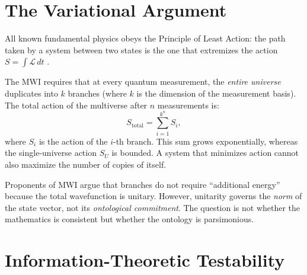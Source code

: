 \documentclass[12pt, a4paper]{article}
\theoremstyle{plain}
\theoremstyle{definition}
\begin{document}
\section{The Variational Argument}\label{sec:least_action}

\begin{axiom}\label{ax:least_action}
  All known fundamental physics obeys the Principle of Least Action: the
  path taken by a system between two states is the one that extremizes
  the action $S = \int \mathcal{L}\, dt$ \citep{Feynman1942, Landau1976}.
\end{axiom}

\begin{proposition}\label{prop:branching}
  The MWI requires that at every quantum measurement, the \emph{entire
  universe} duplicates into $k$ branches (where $k$ is the dimension of
  the measurement basis). The total action of the multiverse after $n$
  measurements is:
  \begin{equation}
    S_{\text{total}} = \sum_{i=1}^{k^n} S_i,
  \end{equation}
  where $S_i$ is the action of the $i$-th branch. This sum grows
  exponentially, whereas the single-universe action $S_U$ is bounded.
  A system that minimizes action cannot also maximize the number of
  copies of itself.
\end{proposition}

\begin{remark}
  Proponents of MWI argue that branches do not require ``additional
  energy'' because the total wavefunction is unitary. However, unitarity
  governs the \emph{norm} of the state vector, not its \emph{ontological
  commitment}. The question is not whether the mathematics is consistent
  but whether the ontology is parsimonious.
\end{remark}

\section{Information-Theoretic Testability}\label{sec:testability}
\end{document}
